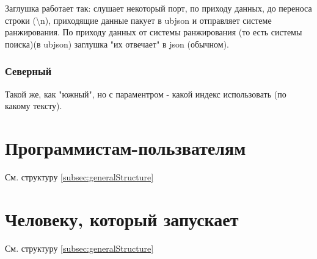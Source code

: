 \documentclass[12pt,a4paper]{article}
\begin{document}
Заглушка работает так: слушает некоторый порт, по приходу данных, до переноса строки (\backslash n), приходящие данные пакует в ubjson и отправляет системе ранжирования. По приходу данных от системы ранжирования (то есть системы поиска)(в ubjson) заглушка "их отвечает" в json (обычном).

\subsubsection{Северный}
Такой же, как "южный", но с параментром - какой индекс использовать (по какому тексту). 

\section{Программистам-пользвателям}
См. структуру \ref{subsec:generalStructure}

\section{Человеку, который запускает}
См. структуру \ref{subsec:generalStructure}
\end{document}

